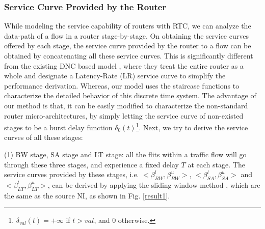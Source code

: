 \documentclass[preprint]{elsarticle}
\begin{document}
\subsubsection{Service Curve Provided by the Router}\label{router}
While modeling the service capability of routers with RTC, we can analyze the data-path of a flow in a router stage-by-stage. On obtaining the service curves offered by each stage, the service curve provided by the router to a flow can be obtained by concatenating all these service curves. This is significantly different from the existing DNC based model \cite{qian2009analysis,Qian489900}, where they treat the entire router as a whole and designate a Latency-Rate (LR) service curve \cite{Boudec2001Network} to simplify the performance derivation. Whereas, our model uses the staircase functions to characterize the detailed behavior of this discrete time system. The advantage of our method is that, it can be easily modified to characterize the non-standard router micro-architectures, by simply letting the service curve of non-existed stages to be a burst delay function $\delta_0(t)$\footnote{$\delta_{val}(t)=+\infty$ if $t>val$, and 0 otherwise.}. Next, we try to derive the service curves of all these stages:

(1) BW stage, SA stage and LT stage: all the flits within a traffic flow will go through these three stages, and experience a fixed delay $T$ at each stage. The service curves provided by these stages, i.e. $<\beta^l_{BW},\beta^u_{BW}>$, $<\beta^l_{SA},\beta^u_{SA}>$ and $<\beta^l_{LT},\beta^u_{LT}>$, can be derived by applying the sliding window method \cite{1253607}, which are the same as the source NI, as shown in Fig. \ref{result1}.
\end{document}
